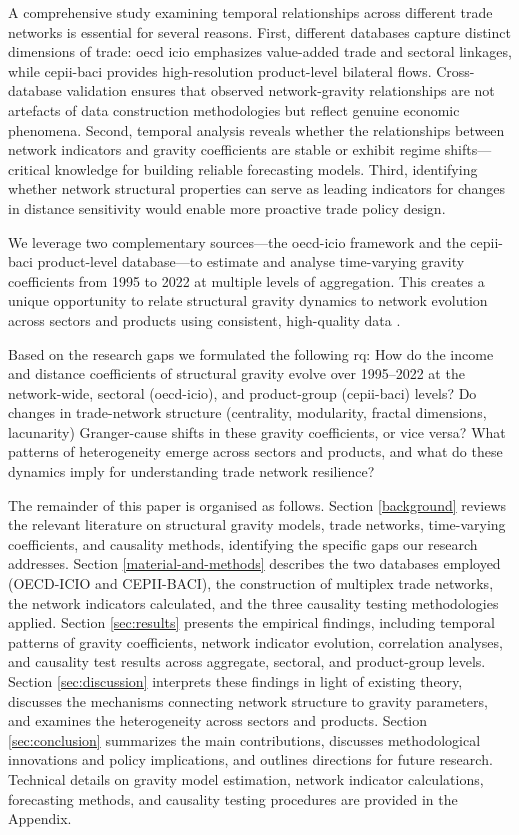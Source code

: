 \documentclass[preprint, 3p,
authoryear]{elsarticle} %
\begin{document}
A comprehensive study examining temporal relationships across different
trade networks is essential for several reasons. First, different
databases capture distinct dimensions of trade: \gls{oecd} \gls{icio}
emphasizes value-added trade and sectoral linkages, while
\gls{cepii}-\gls{baci} provides high-resolution product-level bilateral
flows. Cross-database validation ensures that observed network-gravity
relationships are not artefacts of data construction methodologies but
reflect genuine economic phenomena. Second, temporal analysis reveals
whether the relationships between network indicators and gravity
coefficients are stable or exhibit regime shifts---critical knowledge
for building reliable forecasting models. Third, identifying whether
network structural properties can serve as leading indicators for
changes in distance sensitivity would enable more proactive trade policy
design.

We leverage two complementary sources---the \gls{oecd}-\gls{icio}
framework and the \gls{cepii}-\gls{baci} product-level database---to
estimate and analyse time-varying gravity coefficients from 1995 to 2022
at multiple levels of aggregation. This creates a unique opportunity to
relate structural gravity dynamics to network evolution across sectors
and products using consistent, high-quality data
\citep{gaulier2010, mayer2011, timmer2015}.

Based on the research gaps we formulated the following \gls{rq}: How do
the income and distance coefficients of structural gravity evolve over
1995--2022 at the network-wide, sectoral (\gls{oecd}-\gls{icio}), and
product-group (\gls{cepii}-\gls{baci}) levels? Do changes in
trade-network structure (centrality, modularity, fractal dimensions,
lacunarity) Granger-cause shifts in these gravity coefficients, or vice
versa? What patterns of heterogeneity emerge across sectors and
products, and what do these dynamics imply for understanding trade
network resilience?

The remainder of this paper is organised as follows. Section
\ref{background} reviews the relevant literature on structural gravity
models, trade networks, time-varying coefficients, and causality
methods, identifying the specific gaps our research addresses. Section
\ref{material-and-methods} describes the two databases employed
(OECD-ICIO and CEPII-BACI), the construction of multiplex trade
networks, the network indicators calculated, and the three causality
testing methodologies applied. Section \ref{sec:results} presents the
empirical findings, including temporal patterns of gravity coefficients,
network indicator evolution, correlation analyses, and causality test
results across aggregate, sectoral, and product-group levels. Section
\ref{sec:discussion} interprets these findings in light of existing
theory, discusses the mechanisms connecting network structure to gravity
parameters, and examines the heterogeneity across sectors and products.
Section \ref{sec:conclusion} summarizes the main contributions,
discusses methodological innovations and policy implications, and
outlines directions for future research. Technical details on gravity
model estimation, network indicator calculations, forecasting methods,
and causality testing procedures are provided in the Appendix.
\end{document}
